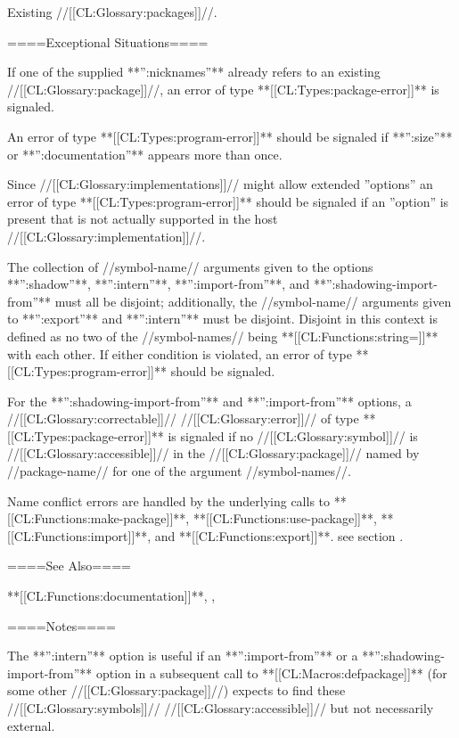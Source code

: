 Existing //[[CL:Glossary:packages]]//.

====Exceptional Situations====

If one of the supplied **'':nicknames''** already refers to an existing //[[CL:Glossary:package]]//, an error of type **[[CL:Types:package-error]]** is signaled.

An error of type **[[CL:Types:program-error]]** should be signaled if **'':size''** or **'':documentation''** appears more than once.

Since //[[CL:Glossary:implementations]]// might allow extended ''options'' an error of type **[[CL:Types:program-error]]** should be signaled if an ''option'' is present that is not actually supported in the host //[[CL:Glossary:implementation]]//.

The collection of //symbol-name// arguments given to the options **'':shadow''**, **'':intern''**, **'':import-from''**, and **'':shadowing-import-from''** must all be disjoint; additionally, the //symbol-name// arguments given to **'':export''** and **'':intern''** must be disjoint. Disjoint in this context is defined as no two of the //symbol-names// being **[[CL:Functions:string=]]** with each other. If either condition is violated, an error of type **[[CL:Types:program-error]]** should be signaled.

For the **'':shadowing-import-from''** and **'':import-from''** options, a //[[CL:Glossary:correctable]]// //[[CL:Glossary:error]]// of type **[[CL:Types:package-error]]** is signaled if no //[[CL:Glossary:symbol]]// is //[[CL:Glossary:accessible]]// in the //[[CL:Glossary:package]]// named by //package-name// for one of the argument //symbol-names//.

Name conflict errors are handled by the underlying calls to **[[CL:Functions:make-package]]**, **[[CL:Functions:use-package]]**, **[[CL:Functions:import]]**, and **[[CL:Functions:export]]**. see section {\secref\PackageConcepts}.

====See Also====

**[[CL:Functions:documentation]]**, {\secref\PackageConcepts}, {\secref\Compilation}

====Notes====

The **'':intern''** option is useful if an **'':import-from''** or a **'':shadowing-import-from''** option in a subsequent call to **[[CL:Macros:defpackage]]** (for some other //[[CL:Glossary:package]]//) expects to find these //[[CL:Glossary:symbols]]// //[[CL:Glossary:accessible]]// but not necessarily external.


